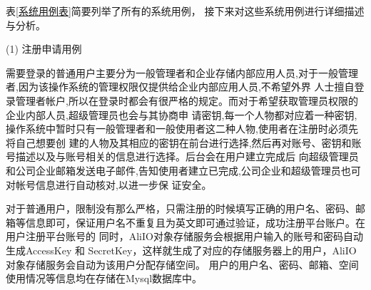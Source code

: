 表\ref{系统用例表}简要列举了所有的系统用例， 接下来对这些系统用例进行详细描述与分析。

(1) 注册申请用例


需要登录的普通用户主要分为一般管理者和企业存储内部应用人员,对于一般管理者,因为该操作系统的管理权限仅提供给企业内部应用人员,不希望外界
人士擅自登录管理者帐户,所以在登录时都会有很严格的规定。而对于希望获取管理员权限的企业内部人员,超级管理员也会与其协商申
请密钥,每一个人物都对应着一种密钥,操作系统中暂时只有一般管理者和一般使用者这二种人物,使用者在注册时必须先将自己想要创
建的人物及其相应的密钥在前台进行选择,然后再对账号、密钥和账号描述以及与账号相关的信息进行选择。后台会在用户建立完成后
向超级管理员和公司企业邮箱发送电子邮件,告知使用者建立已完成,公司企业和超级管理员也可对帐号信息进行自动核对,以进一步保
证安全。

对于普通用户，限制没有那么严格，只需注册的时候填写正确的用户名、密码、邮箱等信息即可，保证用户名不重复且为英文即可通过验证，成功注册平台账户。在用户注册平台账号的
同时，AliIO对象存储服务会根据用户输入的账号和密码自动生成AccessKey 和 SecretKey，这样就生成了对应的存储服务器上的用户，AliIO对象存储服务会自动为该用户分配存储空间。
用户的用户名、密码、邮箱、空间使用情况等信息均在存储在Mysql数据库中。

